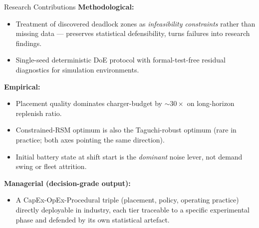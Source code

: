 \documentclass[aspectratio=169,10pt]{beamer}
\begin{document}
\begin{frame}{Research Contributions}
  \footnotesize
  \textbf{Methodological:}
  \begin{itemize}
    \item Treatment of discovered deadlock zones as \emph{infeasibility constraints} rather than missing data --- preserves statistical defensibility, turns failures into research findings.
    \item Single-seed deterministic DoE protocol with formal-test-free residual diagnostics for simulation environments.
  \end{itemize}

  \vspace{0.3em}
  \textbf{Empirical:}
  \begin{itemize}
    \item Placement quality dominates charger-budget by $\sim 30\times$ on long-horizon replenish ratio.
    \item Constrained-RSM optimum is also the Taguchi-robust optimum (rare in practice; both axes pointing the same direction).
    \item Initial battery state at shift start is the \emph{dominant} noise lever, not demand swing or fleet attrition.
  \end{itemize}

  \vspace{0.3em}
  \textbf{Managerial (decision-grade output):}
  \begin{itemize}
    \item A CapEx-OpEx-Procedural triple (placement, policy, operating practice) directly deployable in industry, each tier traceable to a specific experimental phase and defended by its own statistical artefact.
  \end{itemize}
\end{frame}
\end{document}
